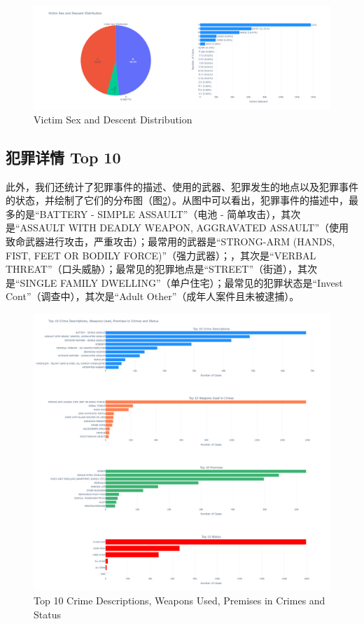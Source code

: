 \documentclass{article}
\begin{document}
\begin{figure}[H]
    \centering
    \includegraphics[width=1\textwidth]{../pic/sex_and_descent.png}
    \caption{Victim Sex and Descent Distribution}
    \label{fig:sex_and_descent}
\end{figure}

\subsection{犯罪详情 Top 10}
此外，我们还统计了犯罪事件的描述、使用的武器、犯罪发生的地点以及犯罪事件的状态，并绘制了它们的分布图（图\ref{fig:top10}）。从图中可以看出，犯罪事件的描述中，最多的是“BATTERY - SIMPLE ASSAULT”（电池 - 简单攻击），其次是“ASSAULT WITH DEADLY WEAPON, AGGRAVATED ASSAULT”（使用致命武器进行攻击，严重攻击）；最常用的武器是“STRONG-ARM (HANDS, FIST, FEET OR BODILY FORCE)”（强力武器）；，其次是“VERBAL THREAT”（口头威胁）；最常见的犯罪地点是“STREET”（街道），其次是“SINGLE FAMILY DWELLING”（单户住宅）；最常见的犯罪状态是“Invest Cont”（调查中），其次是“Adult Other”（成年人案件且未被逮捕）。

\begin{figure}[H]
    \centering
    \includegraphics[width=1\textwidth]{../pic/top10.png}
    \caption{Top 10 Crime Descriptions, Weapons Used, Premises in Crimes and Status}
    \label{fig:top10}
\end{figure}
\end{document}
